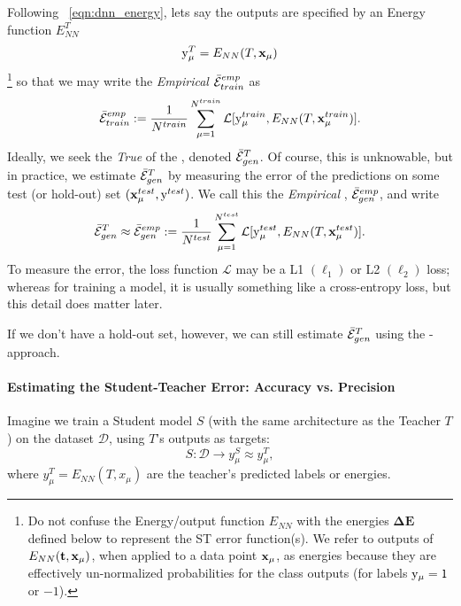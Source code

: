 Following \EQN~\ref{eqn:dnn_energy}, lets say the \Teacher outputs are specified
by an  Energy function $E^{T}_{NN}$
\begin{align}
\label{eqn:T_ENN}
\mathrm{y}_{\mu}^{T}=E_{NN}(T,\mathbf{x}_{\mu}) 
\end{align}
\footnote{Do not confuse the Energy/output function $E_{NN}$ with the energies $\mathbf{\Delta E}$  defined below to represent the ST error function(s).  We refer to outputs of $E_{NN}({\mathbf{t}},\mathbf{x}_{\mu} )$, when applied to a data point $\mathbf{x}_{\mu}$, as energies because they are effectively un-normalized probabilities for the class outputs (for labels $\mathrm{y}_{\mu}=1$ or $-1$).  }
so that we may write the \emph{Empirical} \AverageTrainingError
$\bar{\mathcal{E}}^{emp}_{train}$
as 
\begin{align}
\label{eqn:Eg_train}
\bar{\mathcal{E}}^{emp}_{train}:= \frac{1}{N^{train}}\sum_{\mu=1}^{N^{train}}\mathcal{L}[\mathrm{y}_{\mu}^{train},E_{NN}(T,\mathbf{x}_{\mu}^{train})]  .
\end{align}
Ideally, we seek the \emph{True} \AverageGeneralizationError of the \Teacher, denoted  $\bar{\mathcal{E}}_{gen}^{T}$. 
Of course, this is unknowable, but in practice, we estimate $\bar{\mathcal{E}}_{gen}^{T}$ 
by measuring the error of the \Teacher predictions on some test (or hold-out) set $(\mathbf{x}_{\mu}^{test}, \mathrm{y}^{test})$.
We call this the \emph{Empirical \AverageGeneralizationError}, $\bar{\mathcal{E}}^{emp}_{gen}$, and write
\begin{align}
\label{eqn:Eg_test}
 \bar{\mathcal{E}}_{gen}^{T}\approx \bar{\mathcal{E}}^{emp}_{gen}:= \frac{1}{N^{test}}\sum_{\mu=1}^{N^{test}}\mathcal{L}[\mathrm{y}_{\mu}^{test},E_{NN}(T,\mathbf{x}_{\mu}^{test})] .
\end{align}
To measure the error, the loss function $\mathcal{L}$ may be a L1 $(\ell_1)$ or L2 $(\ell_2)$ loss;
whereas for training a model, it is usually something like a cross-entropy loss, but this detail does matter later.

If we don't have a hold-out set, however, we can still estimate $\bar{\mathcal{E}}_{gen}^{T}$ using the \Student-\Teacher approach.

\paragraph{Estimating the Student-Teacher Error: Accuracy vs. Precision}
Imagine we train a Student model $S$ (with the same architecture as the Teacher $T$) on the dataset $\mathcal D$, using $T$'s outputs as targets:
\begin{equation*}
S: \mathcal D \to y^{S}_\mu \approx y^{T}_\mu,
\end{equation*}
where $y^T_\mu = E_{NN}(T, x_\mu)$ are the teacher’s predicted labels or energies.

